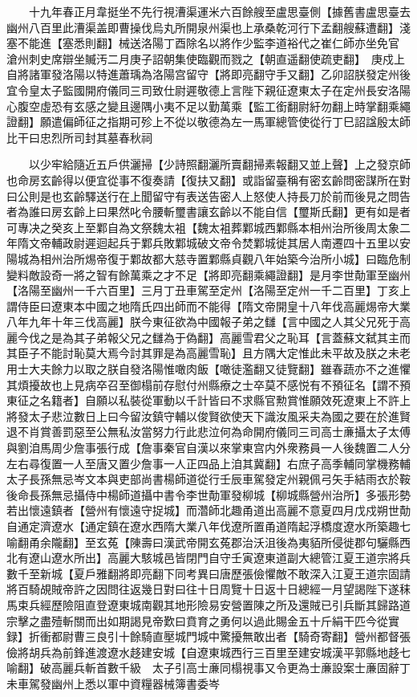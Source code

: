 　　十九年春正月韋挺坐不先行視漕渠運米六百餘艘至盧思臺側【據舊書盧思臺去幽州八百里此漕渠盖即曹操伐烏丸所開泉州渠也上承桑乾河行下孟翻艘蘇遭翻】淺塞不能進【塞悉則翻】械送洛陽丁酉除名以將作少監李道裕代之崔仁師亦坐免官　滄州刺史席辯坐贓汚二月庚子詔朝集使臨觀而戮之【朝直遥翻使疏吏翻】　庚戍上自將諸軍發洛陽以特進蕭瑀為洛陽宫留守【將即亮翻守手又翻】乙卯詔朕發定州後宜令皇太子監國開府儀同三司致仕尉遲敬德上言陛下親征遼東太子在定州長安洛陽心腹空虛恐有玄感之變且邊隅小夷不足以勤萬乘【監工銜翻尉紆勿翻上時掌翻乘繩證翻】願遣偏師征之指期可殄上不從以敬德為左一馬軍總管使從行丁巳詔諡殷太師比干曰忠烈所司封其墓春秋祠

　　以少牢給隨近五戶供灑掃【少詩照翻灑所賣翻掃素報翻又並上聲】上之發京師也命房玄齡得以便宜從事不復奏請【復扶又翻】或詣留臺稱有密玄齡問密謀所在對曰公則是也玄齡驛送行在上聞留守有表送告密人上怒使人持長刀於前而後見之問告者為誰曰房玄齡上曰果然叱令腰斬璽書讓玄齡以不能自信【璽斯氏翻】更有如是者可專决之癸亥上至鄴自為文祭魏太袓【魏太袓葬鄴城西鄴縣本相州治所後周太象二年隋文帝輔政尉遲迴起兵于鄴兵敗鄴城破文帝令焚鄴城徙其居人南遷四十五里以安陽城為相州治所焬帝復于鄴故都大慈寺置鄴縣貞觀八年始築今治所小城】曰臨危制變料敵設奇一將之智有餘萬乘之才不足【將即亮翻乘繩證翻】是月李世勣軍至幽州【洛陽至幽州一千六百里】三月丁丑車駕至定州【洛陽至定州一千二百里】丁亥上謂侍臣曰遼東本中國之地隋氏四出師而不能得【隋文帝開皇十八年伐高麗焬帝大業八年九年十年三伐高麗】朕今東征欲為中國報子弟之讎【言中國之人其父兄死于高麗今伐之是為其子弟報父兄之讎為于偽翻】高麗雪君父之恥耳【言蓋蘇文弑其主而其臣子不能討恥莫大焉今討其罪是為高麗雪恥】且方隅大定惟此未平故及朕之未老用士大夫餘力以取之朕自發洛陽惟噉肉飯【噉徒濫翻又徒覽翻】雖春蔬亦不之進懼其煩擾故也上見病卒召至御榻前存慰付州縣療之士卒莫不感悦有不預征名【謂不預東征之名籍者】自願以私裝從軍動以千計皆曰不求縣官勲賞惟願效死遼東上不許上將發太子悲泣數日上曰今留汝鎮守輔以俊賢欲使天下識汝風采夫為國之要在於進賢退不肖賞善罰惡至公無私汝當努力行此悲泣何為命開府儀同三司高士亷攝太子太傅與劉洎馬周少詹事張行成【詹事秦官自漢以來掌東宫内外衆務員一人後魏置二人分左右尋復置一人至唐又置少詹事一人正四品上洎其冀翻】右庶子高季輔同掌機務輔太子長孫無忌岑文本與吏部尚書楊師道從行壬辰車駕發定州親佩弓矢手結雨衣於鞍後命長孫無忌攝侍中楊師道攝中書令李世勣軍發柳城【柳城縣營州治所】多張形勢若出懷遠鎮者【營州有懷遠守捉城】而濳師北趣甬道出高麗不意夏四月戊戍朔世勣自通定濟遼水【通定鎮在遼水西隋大業八年伐遼所置甬道隋起浮橋度遼水所築趣七喻翻甬余隴翻】至玄菟【陳壽曰漢武帝開玄菟郡治沃沮後為夷貊所侵徙郡句驪縣西北有遼山遼水所出】高麗大駭城邑皆閉門自守壬寅遼東道副大總管江夏王道宗將兵數千至新城【夏戶雅翻將即亮翻下同考異曰唐歷張儉懼敵不敢深入江夏王道宗固請將百騎覘賊帝許之因問往返幾日對曰往十日周覽十日返十日總經一月望謁陛下遂秣馬束兵經歷險阻直登遼東城南觀其地形險易安營置陳之所及還賊已引兵斷其歸路道宗擊之盡殪斬關而出如期謁見帝歎曰賁育之勇何以過此賜金五十斤絹干匹今從實録】折衝都尉曹三良引十餘騎直壓城門城中驚擾無敢出者【騎奇寄翻】營州都督張儉將胡兵為前鋒進渡遼水趍建安城【自遼東城西行三百里至建安城漢平郭縣地趍七喻翻】破高麗兵斬首數千級　太子引高士亷同榻視事又令更為士亷設案士亷固辭丁未車駕發幽州上悉以軍中資糧器械簿書委岑


